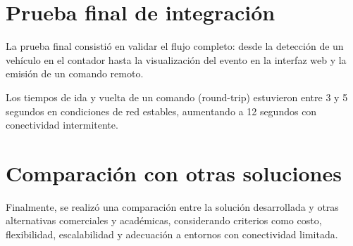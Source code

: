 
\section{Prueba final de integración}
\label{sec:prueba-integracion}

La prueba final consistió en validar el flujo completo: desde la detección de un vehículo 
en el contador hasta la visualización del evento en la interfaz web y la emisión de un comando remoto.  


Los tiempos de ida y vuelta de un comando (round-trip) estuvieron entre 3 y 5 segundos 
en condiciones de red estables, aumentando a 12 segundos con conectividad intermitente.  

\section{Comparación con otras soluciones}
\label{sec:comparacion}

Finalmente, se realizó una comparación entre la solución desarrollada y otras alternativas 
comerciales y académicas, considerando criterios como costo, flexibilidad, escalabilidad 
y adecuación a entornos con conectividad limitada.  

